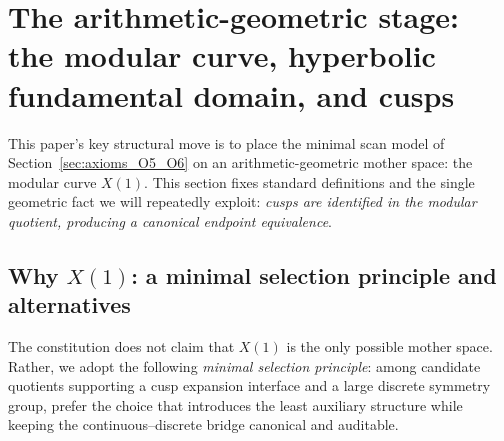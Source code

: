 \section{The arithmetic-geometric stage: the modular curve, hyperbolic fundamental domain, and cusps}
\label{sec:modular_curve_stage}

This paper's key structural move is to place the minimal scan model of Section~\ref{sec:axioms_O5_O6} on an arithmetic-geometric mother space: the modular curve $X(1)$. This section fixes standard definitions and the single geometric fact we will repeatedly exploit: \emph{cusps are identified in the modular quotient, producing a canonical endpoint equivalence}.

\subsection{Why \texorpdfstring{$X(1)$}{X(1)}: a minimal selection principle and alternatives}
\label{sec:why_x1_selection}

The constitution does not claim that $X(1)$ is the only possible mother space. Rather, we adopt the following \emph{minimal selection principle}: among candidate quotients supporting a cusp expansion interface and a large discrete symmetry group, prefer the choice that introduces the least auxiliary structure while keeping the continuous--discrete bridge canonical and auditable.

